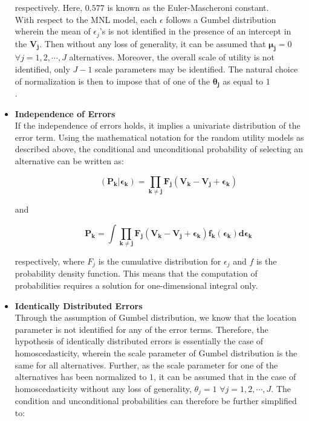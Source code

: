 \documentclass[a4paper,11pt]{article}
\begin{document}
\begin{itemize}
         respectively. Here, $0.577$ is known as the Euler-Mascheroni constant.\\ 
         
         With respect to the MNL model, each $\epsilon$ follows a Gumbel distribution wherein the mean of $\epsilon_{j}$'s is not identified in the presence of an intercept in the $\mathbf{V_{j}}$. Then without any loss of generality, it can be assumed that $\mathbf{\mu_{j}} = 0$ $\forall j = 1, 2, \cdots, J$ alternatives. Moreover, the overall scale of utility is not identified, only $J-1$ scale parameters may be identified. The natural choice of normalization is then to impose that of one of the $\mathbf{\theta_{j}}$ as equal to $1$ \cite{Croissant}\\.   
         
        \item \textbf{Independence of Errors} \\

        If the independence of errors holds, it implies a univariate distribution of the error term. Using the mathematical notation for the random utility models as described  above, the conditional and unconditional probability of selecting an alternative can be written as:
        
        \begin{equation*}
            \qquad \mathbf{(P_{k}|\epsilon_{k}) = \prod_{k \neq j} F_{j}(V_{k} - V_{j} + \epsilon_{k})}
        \end{equation*}

        and

        \begin{equation*}
            \qquad \mathbf{P_{k} = \int \prod_{k \neq j} F_{j}(V_{k} - V_{j} + \epsilon_{k})f_{k}(\epsilon_{k})d\epsilon_{k}}
        \end{equation*}

        respectively, where $F_{j}$ is the cumulative distribution for $\epsilon_{j}$ and $f$ is the probability density function. This means that the computation of probabilities requires a solution for one-dimensional integral only.\\

        \item \textbf{Identically Distributed Errors}\\

        Through the assumption of Gumbel distribution, we know that the location parameter is not identified for any of the error terms. Therefore, the hypothesis of identically distributed errors is essentially the case of homoscedasticity, wherein the scale parameter of Gumbel distribution is the same for all alternatives. Further, as the scale parameter for one of the alternatives has been normalized to $1$, it can be assumed that in the case of homoscedasticity without any loss of generality, $\theta_{j} = 1$ $\forall j = 1, 2,\cdots, J$. The condition and unconditional probabilities can therefore be further simplified to:  


\end{itemize}
\end{document}
